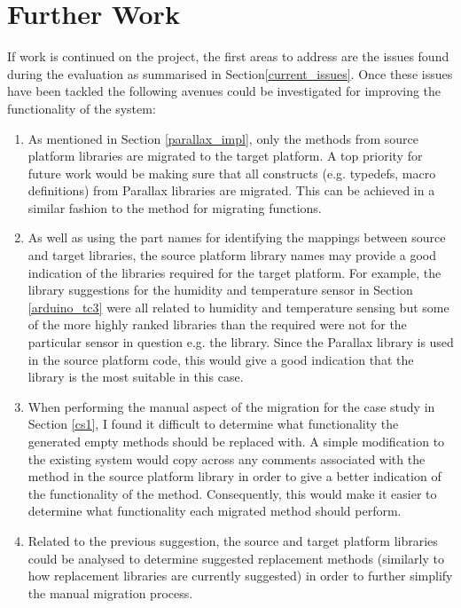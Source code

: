 \documentclass{UoYCSproject}
\begin{document}
\section{Further Work}
If work is continued on the project, the first areas to address are the issues found during the evaluation as summarised in Section\ref{current_issues}. Once these issues have been tackled the following avenues could be investigated for improving the functionality of the system:
\begin{enumerate}
\item As mentioned in Section \ref{parallax_impl}, only the methods from source platform libraries are migrated to the target platform. A top priority for future work would be making sure that all constructs (e.g. typedefs, macro definitions) from Parallax libraries are migrated. This can be achieved in a similar fashion to the method for migrating functions.
\item As well as using the part names for identifying the mappings between source and target libraries, the source platform library names may provide a good indication of the libraries required for the target platform. For example, the library suggestions for the humidity and temperature sensor in Section \ref{arduino_tc3} were all related to humidity and temperature sensing but some of the more highly ranked libraries than the required  were not for the particular sensor in question e.g. the  library. Since the Parallax  library is used in the source platform code, this would give a good indication that the  library is the most suitable in this case.
\item When performing the manual aspect of the migration for the case study in Section \ref{cs1}, I found it difficult to determine what functionality the generated empty methods should be replaced with. A simple modification to the existing system would copy across any comments associated with the method in the source platform library in order to give a better indication of the functionality of the method. Consequently, this would make it easier to determine what functionality each migrated method should perform.
\item Related to the previous suggestion, the source and target platform libraries could be analysed to determine suggested replacement methods (similarly to how replacement libraries are currently suggested) in order to further simplify the manual migration process. 
\end{enumerate}
\end{document}
